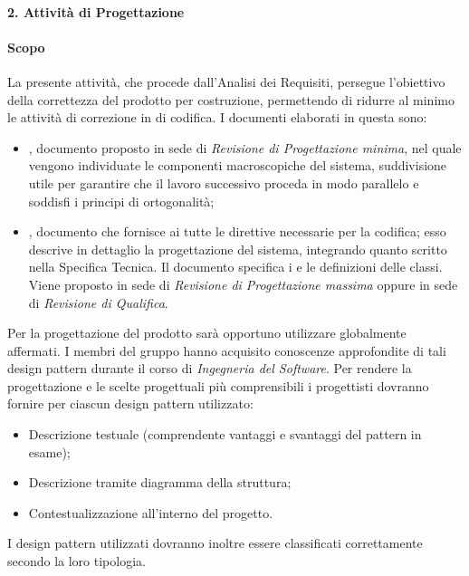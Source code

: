 			
		\paragraph*{2. Attività di Progettazione}
			\paragraph*{Scopo}
		        La presente attivit\`a, che procede dall'Analisi dei Requisiti, persegue l'obiettivo
		        della correttezza del prodotto per costruzione, permettendo di ridurre al minimo le attività di correzione
		        in  di codifica.
                        I documenti elaborati in questa  sono:
                        \begin{itemize}
                        \item {}, documento proposto in sede di \textit{Revisione di Progettazione minima}, nel quale vengono individuate 
			 le componenti macroscopiche del sistema, suddivisione utile per garantire che il lavoro successivo proceda in modo parallelo e soddisfi i principi di ortogonalità;
                        \item {}, documento che fornisce ai  tutte le direttive necessarie per la codifica;
					    esso descrive in dettaglio la progettazione del sistema, integrando quanto scritto nella Specifica Tecnica. Il documento specifica i   e le
					    definizioni delle classi. Viene proposto in sede di \textit{Revisione di Progettazione massima} oppure in sede di \textit{Revisione di Qualifica}.
                        \end{itemize}
		        Per la progettazione del prodotto sarà opportuno utilizzare  globalmente affermati.
			I membri del gruppo hanno acquisito conoscenze approfondite di tali design pattern durante il corso di \textit{Ingegneria del Software}.
			Per rendere la progettazione e le scelte progettuali più comprensibili i progettisti dovranno fornire per ciascun design pattern
			utilizzato:
			\begin{itemize}
                		\item Descrizione testuale (comprendente vantaggi e svantaggi del pattern in esame);
				\item Descrizione tramite diagramma della struttura;
				\item Contestualizzazione all'interno del progetto.
			\end{itemize} 
			I design pattern utilizzati dovranno inoltre essere classificati correttamente secondo la loro tipologia.

